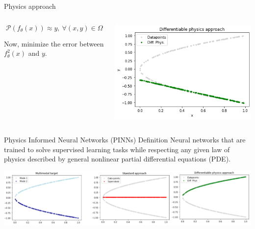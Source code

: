 \documentclass[aspectratio=1610,xcolor={dvipsnames},hyperref={colorlinks,unicode,linkcolor=violet,anchorcolor=BlueViolet,citecolor=YellowOrange,filecolor=black,urlcolor=Aquamarine}]{beamer}
\begin{document}
\begin{frame}[label={sec:orgf972ef5}]{Physics approach}
\begin{columns}
\begin{column}{0.4\columnwidth}
\[\mathcal{P}(f_{\theta}(x)) \approx y,\ \forall (x, y) \in \Omega\]

Now, minimize the error between \(f^{2}_{\theta}(x)\)  and \(y\).
\end{column}

\begin{column}{0.6\columnwidth}
\begin{center}
\includegraphics[width=.9\linewidth]{./p3.png}
\end{center}
\end{column}
\end{columns}
\end{frame}

\begin{frame}[label={sec:org0b84944}]{Physics Informed Neural Networks (PINNs) Definition}
Neural networks that are trained to solve supervised learning tasks
while respecting any given law of physics described by general
nonlinear partial differential equations (PDE).

\begin{center}
\includegraphics[width=.9\linewidth]{./p4.png}
\end{center}
\end{frame}
\end{document}
